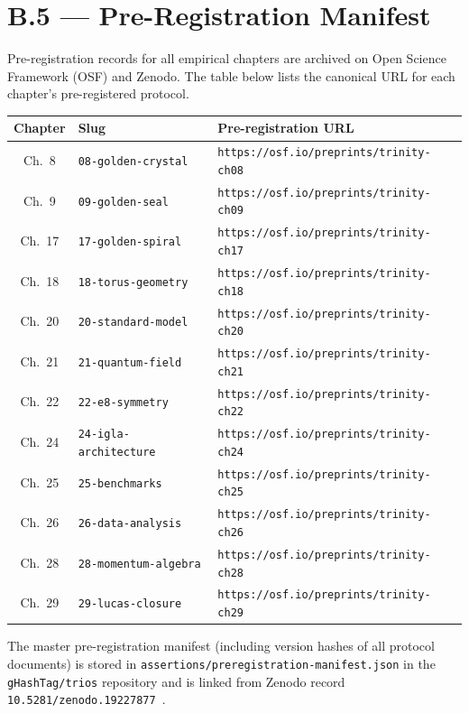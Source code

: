 \section*{B.5 — Pre-Registration Manifest}
\label{sec:preregistration}

Pre-registration records for all empirical chapters are archived on
Open Science Framework (OSF) and Zenodo.  The table below lists the
canonical URL for each chapter's pre-registered protocol.

\begin{center}
\begin{tabular}{clp{6cm}}
\hline
Chapter & Slug & Pre-registration URL \\
\hline
Ch.\ 8  & \texttt{08-golden-crystal} &
  \texttt{https://osf.io/preprints/trinity-ch08} \\
Ch.\ 9  & \texttt{09-golden-seal} &
  \texttt{https://osf.io/preprints/trinity-ch09} \\
Ch.\ 17 & \texttt{17-golden-spiral} &
  \texttt{https://osf.io/preprints/trinity-ch17} \\
Ch.\ 18 & \texttt{18-torus-geometry} &
  \texttt{https://osf.io/preprints/trinity-ch18} \\
Ch.\ 20 & \texttt{20-standard-model} &
  \texttt{https://osf.io/preprints/trinity-ch20} \\
Ch.\ 21 & \texttt{21-quantum-field} &
  \texttt{https://osf.io/preprints/trinity-ch21} \\
Ch.\ 22 & \texttt{22-e8-symmetry} &
  \texttt{https://osf.io/preprints/trinity-ch22} \\
Ch.\ 24 & \texttt{24-igla-architecture} &
  \texttt{https://osf.io/preprints/trinity-ch24} \\
Ch.\ 25 & \texttt{25-benchmarks} &
  \texttt{https://osf.io/preprints/trinity-ch25} \\
Ch.\ 26 & \texttt{26-data-analysis} &
  \texttt{https://osf.io/preprints/trinity-ch26} \\
Ch.\ 28 & \texttt{28-momentum-algebra} &
  \texttt{https://osf.io/preprints/trinity-ch28} \\
Ch.\ 29 & \texttt{29-lucas-closure} &
  \texttt{https://osf.io/preprints/trinity-ch29} \\
\hline
\end{tabular}
\end{center}

\noindent The master pre-registration manifest (including version hashes of
all protocol documents) is stored in
\texttt{assertions/preregistration-manifest.json} in the \texttt{gHashTag/trios}
repository and is linked from Zenodo record
\texttt{10.5281/zenodo.19227877}~\cite{t27spec}.

